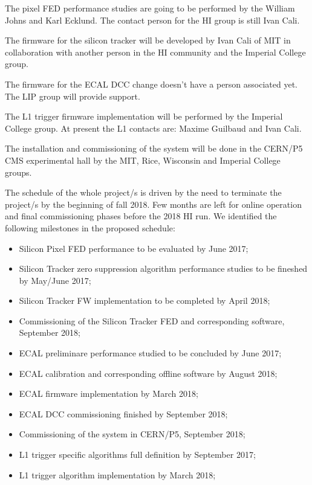 The pixel FED performance studies are going to be performed by the William Johns and Karl Ecklund. The contact person
for the HI group is still Ivan Cali. 
 
The firmware for the silicon tracker will be developed by Ivan Cali of MIT in collaboration with another person in the HI community and the Imperial
College group.

The firmware for the ECAL DCC change doesn't have a person associated yet. The LIP group will provide support.

The L1 trigger firmware implementation will be performed by the Imperial College group. At present the L1 contacts are: Maxime Guilbaud and Ivan Cali. 

The installation and commissioning of the system will be done in the CERN/P5 CMS experimental hall by the MIT, Rice,
Wisconsin and Imperial College groups.

The schedule of the whole project/s is driven by the need to terminate the project/s by the beginning of fall 2018. Few months are left for online operation and final commissioning phases before the 2018 HI run. 
We identified the following milestones in the proposed schedule:

\begin{itemize}
\item Silicon Pixel FED performance to be evaluated by June 2017;
\item Silicon Tracker zero suppression algorithm performance studies to be fineshed by May/June 2017;
\item Silicon Tracker FW implementation to be completed by April 2018;
\item Commissioning of the Silicon Tracker FED and corresponding software, September 2018;
\item ECAL preliminare performance studied to be concluded by June 2017;
\item ECAL calibration and corresponding offline software by August 2018;
\item ECAL firmware implementation by March 2018;
\item ECAL DCC commissioning finished by September 2018;
\item Commissioning of the system in CERN/P5, September 2018;
\item L1 trigger specific algorithms full definition by September 2017;
\item L1 trigger algorithm  implementation by March 2018;
\end{itemize}
